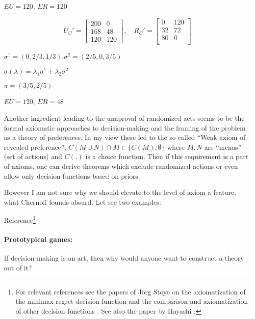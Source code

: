 \documentclass{article}
\begin{document}
$EU = 120$, $ER = 120$


\[
U_C' =
\begin{bmatrix}
    200 & 0 \\
    168 & 48 \\
    120 & 120
\end{bmatrix}
, \quad
R_C' =
\begin{bmatrix}
    0 & 120 \\
    32 & 72 \\
    80 & 0 \\
\end{bmatrix}
\]

$\sigma^1=(0,2/3,1/3)$,$\sigma^2=(2/5,0,3/5)$

$\sigma(\lambda)=\lambda_1 \sigma^1 + \lambda_2 \sigma^2$

$\pi=(3/5,2/5)$

$EU = 120$, $ER = 48$




Another ingredient leading to the unaproval of randomized acts seems to be the formal axiomatic approaches to decision-making and the framing of the problem as a theory of preferences.
In my view these led to the so called ``Weak axiom of revealed preference'': $C(M \cup N ) \cap M \in \{C(M), \emptyset\}$ where $M,N$ are ``menus'' (set of actions) and $C(.)$ is a choice function.
Then if this requirement is a part of axioms, one can derive theorems which exclude randomized actions or even allow only decision functions based on priors.

However I am not sure why we should elevate to the level of axiom a feature, what Chernoff founds absurd. Let see two examples:

Reference\footnote{For relevant references see the papers of Jörg Stoye on the axiomatization of the minimax regret decision function \cite{paper:Stoye2011AxiomsForMinimaxRegret} and the comparison and axiomatization of other decision functions \cite{paper:Stoye2012NewPerspectivesOnStatisticalDecisionsUnderAmbiguity,paper:Stoye2010StatisticalDecisionsUnderAmbiguity}. See also the paper by Hayashi \cite{paper:RegretAversion}.}

\fi



\paragraph{Prototypical games:}
If decision-making is an art, then why would anyone want to construct a theory out of it?
\end{document}
